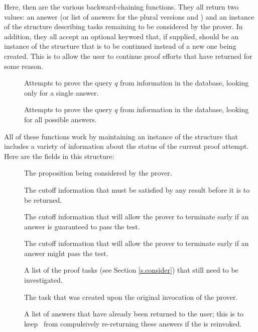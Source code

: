Here, then are the various backward-chaining functions.  They all
return two values: an answer (or list of answers for the plural
versions  and ) and an instance of the
 structure describing tasks remaining to be considered
by the prover.  In addition, they all accept an optional
 keyword that, if supplied, should be an instance of
the  structure that is to be continued instead of a
new one being created.  This is to allow the user to continue proof
efforts that have returned for some reason.
 \begin{description}
 \item [] Attempts to prove the query $q$ from information
in the database, looking only for a single answer.
 \item [] Attempts to prove the query $q$ from information
in the database, looking for all possible answers.
 \end{description}

All of these functions work by maintaining an instance of the
 structure that
includes a variety of information about the status of the current
proof attempt.  Here are the fields in this structure:
 \begin{description}
 \item [] The proposition being considered by the prover.
 \item [] The cutoff information that must be satisfied
by any result before it is to be returned.
 \item [] The cutoff information that will allow the
prover to terminate early if an answer is guaranteed to pass the test.
 \item [] The cutoff information that will allow the
prover to terminate early if an answer might pass the test.
 \item [] A list of the proof tasks (see Section
\ref{s.consider}) that still need to be investigated.
 \item [] The task that was created upon the 
original invocation of the prover.
 \item [] A list of answers that have already
been returned to the user; this is to keep \mvl\ from compulsively
re-returning these answers if the  is reinvoked.
 \end{description}

